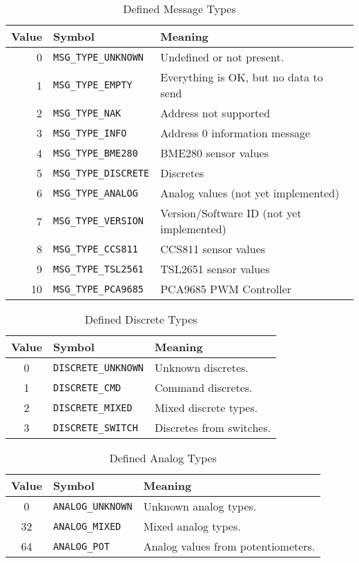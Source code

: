 \documentclass[10pt, openany, draft]{article}
\begin{document}
\begin{table}
  \centering
  \begin{tabular}{r l l}
    \hline
    Value & Symbol & Meaning \\
    \hline
    0 & \texttt{MSG\_TYPE\_UNKNOWN} & Undefined or not present.\\
    1 & \texttt{MSG\_TYPE\_EMPTY} & Everything is OK, but no data to send \\
    2 & \texttt{MSG\_TYPE\_NAK} & Address not supported \\
    3 & \texttt{MSG\_TYPE\_INFO} & Address 0 information message \\
    4 & \texttt{MSG\_TYPE\_BME280} & BME280 sensor values \\
    5 & \texttt{MSG\_TYPE\_DISCRETE} & Discretes \\
    6 & \texttt{MSG\_TYPE\_ANALOG} & Analog values (not yet implemented) \\
    7 & \texttt{MSG\_TYPE\_VERSION} & Version/Software ID (not yet implemented) \\
    8 & \texttt{MSG\_TYPE\_CCS811} & CCS811 sensor values \\
    9 & \texttt{MSG\_TYPE\_TSL2561} & TSL2651 sensor values \\
    10 & \texttt{MSG\_TYPE\_PCA9685} & PCA9685 PWM Controller\\
  \end{tabular}
  \caption{Defined Message Types}
  \label{tab:messagetype}
\end{table}

\begin{table}
  \centering
  \begin{tabular}{c l l}
    \hline
    Value & Symbol & Meaning \\
    \hline
    0 & \texttt{DISCRETE\_UNKNOWN} & Unknown discretes.\\
    1 & \texttt{DISCRETE\_CMD} & Command discretes.\\
    2 & \texttt{DISCRETE\_MIXED} & Mixed discrete types.\\
    3 & \texttt{DISCRETE\_SWITCH} & Discretes from switches.\\
  \end{tabular}
  \caption{Defined Discrete Types}
  \label{tab:disctype}
\end{table}

\begin{table}
  \centering
  \begin{tabular}{c l l}
    \hline
    Value & Symbol & Meaning \\
    \hline
    0 & \texttt{ANALOG\_UNKNOWN} & Unknown analog types.\\
    32 & \texttt{ANALOG\_MIXED} & Mixed analog types.\\
    64 & \texttt{ANALOG\_POT} & Analog values from potentiometers.\\
  \end{tabular}
  \caption{Defined Analog Types}
  \label{tab:analogtype}
\end{table}
\end{document}
